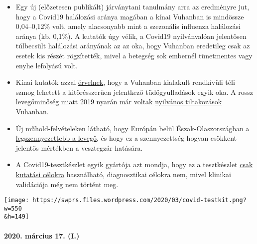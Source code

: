 \begin{itemize}
\tightlist
\item
  Egy új (előzetesen publikált) járványtani tanulmány arra az eredményre
  jut, hogy a Covid19 halálozási aránya magában a kínai Vuhanban is
  mindössze 0,04--0,12\% volt, amely alacsonyabb mint a szezonális
  influenza halálozási aránya (kb. 0,1\%). A kutatók úgy vélik, a
  Covid19 nyilvánvalóan jelentősen túlbecsült halálozási arányának az az
  oka, hogy Vuhanban eredetileg csak az esetek kis részét rögzítették,
  mivel a betegség sok embernél tünetmentes vagy enyhe lefolyású volt.
\item
  Kínai kutatók azzal
  \href{https://www.eurasiareview.com/01022020-polluted-air-could-be-an-important-cause-of-wuhan-pneumonia-oped/}{érvelnek},
  hogy a Vuhanban kialakult rendkívüli téli szmog lehetett a
  kitörésszerűen jelentkező tüdőgyulladások egyik oka. A rossz
  levegőminőség miatt 2019 nyarán már voltak
  \href{https://www.cnn.com/2019/07/10/asia/china-wuhan-pollution-problems-intl-hnk/index.html}{nyilvános
  tiltakozások} Vuhanban.
\item
  Új műhold-felvételeken látható, hogy Európán belül
  Észak-Olaszországban a
  \href{https://twitter.com/esa/status/1238480433047916545}{legszennyezettebb
  a levegő}, és hogy ez a szennyezettség hogyan csökkent jelentős
  mértékben a vesztegzár hatására.
\item
  A Covid19-tesztkészlet egyik gyártója azt mondja, hogy ez a
  tesztkészlet
  \href{https://www.creative-diagnostics.com/sars-cov-2-coronavirus-multiplex-rt-qpcr-kit-277854-457.htm}{csak
  kutatási célokra} használható, diagnosztikai célokra nem, mivel
  klinikai validációja még nem történt meg.
\end{itemize}

\texttt{[image: https://swprs.files.wordpress.com/2020/03/covid-testkit.png?w=550\\\&h=149]}

\hypertarget{2020-muxe1rcius-17-i}{%
\paragraph{2020. március 17. (I.)}\label{2020-muxe1rcius-17-i}}

